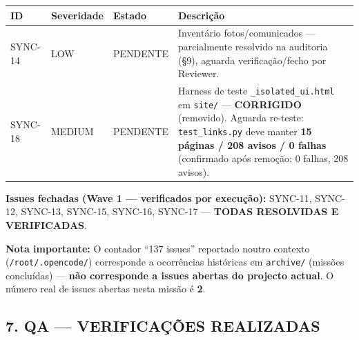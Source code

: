 {\def\LTcaptype{none} %
\begin{longtable}[]{@{}
  >{\raggedright\arraybackslash}p{}
  >{\raggedright\arraybackslash}p{}
  >{\raggedright\arraybackslash}p{}
  >{\raggedright\arraybackslash}p{}@{}}
\toprule\noalign{}
\begin{minipage}[b]{\linewidth}\raggedright
ID
\end{minipage} & \begin{minipage}[b]{\linewidth}\raggedright
Severidade
\end{minipage} & \begin{minipage}[b]{\linewidth}\raggedright
Estado
\end{minipage} & \begin{minipage}[b]{\linewidth}\raggedright
Descrição
\end{minipage} \\
\midrule\noalign{}
\endhead
\bottomrule\noalign{}
\endlastfoot
SYNC-14 & LOW & {PENDENTE} & Inventário fotos/comunicados ---
parcialmente resolvido na auditoria (§9), aguarda verificação/fecho por
Reviewer. \\
SYNC-18 & MEDIUM & {PENDENTE} & Harness de teste
\texttt{\_isolated\_ui.html} em \texttt{site/} --- \textbf{CORRIGIDO}
(removido). Aguarda re-teste: \texttt{test\_links.py} deve manter
\textbf{15 páginas / 208 avisos / 0 falhas} (confirmado após remoção: 0
falhas, 208 avisos). \\
\end{longtable}
}

\textbf{Issues fechadas (Wave 1 --- verificados por execução):} SYNC-11,
SYNC-12, SYNC-13, SYNC-15, SYNC-16, SYNC-17 --- \textbf{TODAS RESOLVIDAS
E VERIFICADAS}.

\textbf{Nota importante:} O contador ``137 issues'' reportado noutro
contexto (\texttt{/root/.opencode/}) corresponde a ocorrências
históricas em \texttt{archive/} (missões concluídas) --- \textbf{não
corresponde a issues abertas do projecto actual}. O número real de
issues abertas nesta missão é \textbf{2}.

\subsection{7. QA --- VERIFICAÇÕES
REALIZADAS}\label{qa-verificauxe7uxf5es-realizadas}

